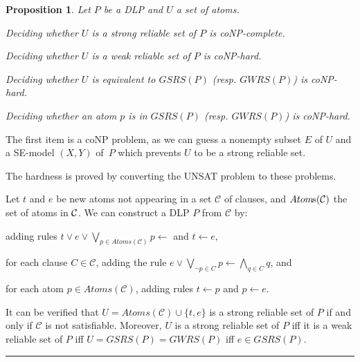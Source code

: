 \documentclass{article}
\newenvironment{tight_itemize}{
\begin{itemize}
   \setlength{\itemsep}{0pt}%
  \setlength{\topsep}{0pt}%
  \setlength{\partopsep}{0pt}%
  \setlength{\parskip}{0pt}%
  \setlength{\parsep}{0pt}%
}{\end{itemize}}
\newtheorem{proposition}{Proposition}
\newenvironment{proofs}{{\bf Proof Sketch:}}{\rule{2mm}{2mm}\\[-.5em] }
\newcommand{\Atom}{Atom\!s}
\newcommand{\GSRS}{G\!S\!R\!S}
\newcommand{\GWRS}{G\!W\!R\!S}
\begin{document}
\begin{proposition}\label{prop:complex}
  Let $P$ be a DLP and $U$ a set of atoms.
  \begin{tight_itemize}
    \item Deciding whether $U$ is a strong reliable set of $P$ is coNP-complete.
    \item Deciding whether $U$ is a weak reliable set of $P$ is coNP-hard.
    \item Deciding whether $U$ is equivalent to $\GSRS(P)$ (resp. $\GWRS(P)$) is coNP-hard.
    \item Deciding whether an atom $p$ is in $\GSRS(P)$ (resp. $\GWRS(P)$) is coNP-hard.
  \end{tight_itemize}
\end{proposition}
\begin{proofs}
  The first item is a coNP problem, as we can guess a nonempty subset $E$ of $U$ and a SE-model $(X, Y)$ of~$P$ which prevents $U$ to be a strong reliable set.

  The hardness is proved by converting the UNSAT problem to these problems.

  Let $t$ and $e$ be new atoms not appearing in a set $\mathcal{C}$ of clauses, and $\Atom(\cal C)$ the set of atoms in $\cal C$.
  We can construct a DLP $P$ from $\mathcal{C}$ by:
  \begin{tight_itemize}
    \item adding rules $t\lor e\lor \bigvee_{p\in \Atom(\mathcal{C})} p\gets$ and $t\gets e$,
    \item for each clause $C\in\mathcal{C}$, adding the rule $e\lor \bigvee_{\neg p\in C} p \gets \bigwedge_{q\in C} q$, and
    \item for each atom $p\in\Atom(\mathcal{C})$, adding rules $t\gets p$ and $p\gets e$.
  \end{tight_itemize}
  It can be verified that $U =\Atom(\mathcal{C})\cup\{t, e\}$ is a strong reliable set of $P$ if and only if $\mathcal{C}$ is not satisfiable. Moreover, $U$ is a strong reliable set of $P$ if{f} it is a weak reliable set of $P$ if{f} $U = \GSRS(P)= \GWRS(P)$ if{f} $e\in \GSRS(P)$.
\end{proofs}
\end{document}
